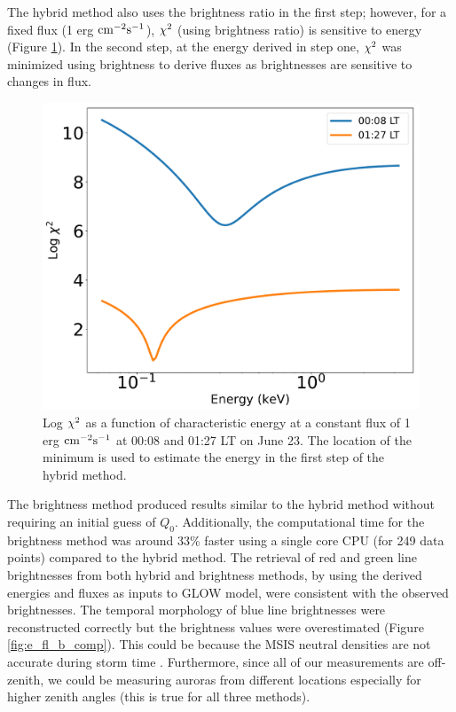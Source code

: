 \documentclass[crop=false,class=mitthesis,oneside,font=12pt]{standalone}
\begin{document}
The hybrid method also uses the brightness ratio in the first step; however, for a fixed flux (1 erg $\rm cm^{-2}s^{-1}$), $\rm \chi^2$ (using brightness ratio) is sensitive to energy (Figure \ref{fig:chi_hybrid}). In the second step, at the energy derived in step one, $\rm \chi^2$ was minimized using brightness to derive fluxes as brightnesses are sensitive to changes in flux.
\begin{figure}[H]
	\centering\includegraphics[width=32pc]{different_fl_evschi2.pdf}
	\caption{Log $\rm \chi^2$ as a function of characteristic energy at a constant flux of 1 erg $\rm cm^{-2} s^{-1}$ at 00:08 and 01:27 LT on June 23. The location of the minimum is used to estimate the energy in the first step of the hybrid method.}
	\label{fig:chi_hybrid}
\end{figure}

The brightness method produced results similar to the hybrid method without requiring an initial guess of $Q_0$. Additionally, the computational time for the brightness method was around 33\% faster using a single core CPU (for 249 data points) compared to the hybrid method. The retrieval of red and green line brightnesses from both hybrid and brightness methods, by using the derived energies and fluxes as inputs to GLOW model, were consistent with the observed brightnesses. The temporal morphology of blue line brightnesses were reconstructed correctly but the brightness values were overestimated (Figure \ref{fig:e_fl_b_comp}). This could be because the MSIS neutral densities are not accurate during storm time \citep{fang_variations_2012}. Furthermore, since all of our measurements are off-zenith, we could be measuring auroras from different locations especially for higher zenith angles (this is true for all three methods).
\end{document}
